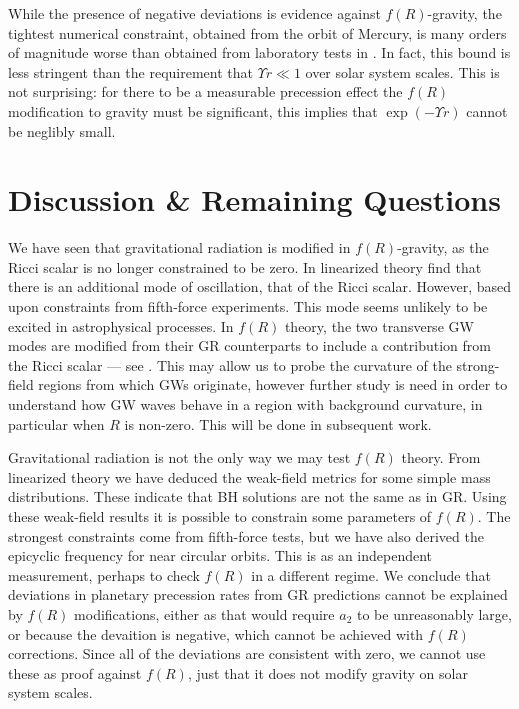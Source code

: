 While the presence of negative deviations is evidence against $f(R)$-gravity, the tightest numerical constraint, obtained from the orbit of Mercury, is many orders of magnitude worse than obtained from laboratory tests in . In fact, this bound is less stringent than the requirement that $\Upsilon r \ll 1$ over solar system scales. This is not surprising: for there to be a measurable precession effect the $f(R)$ modification to gravity must be significant, this implies that $\exp(-\Upsilon r)$ cannot be neglibly small.

\section{Discussion \& Remaining Questions}

We have seen that gravitational radiation is modified in $f(R)$-gravity, as the Ricci scalar is no longer constrained to be zero. In linearized theory find that there is an additional mode of oscillation, that of the Ricci scalar. However, based upon constraints from fifth-force experiments. This mode seems unlikely to be excited in astrophysical processes. In $f(R)$ theory, the two transverse GW modes are modified from their GR counterparts to include a contribution from the Ricci scalar --- see . This may allow us to probe the curvature of the strong-field regions from which GWs originate, however further study is need in order to understand how GW waves behave in a region with background curvature, in particular when $R$ is non-zero. This will be done in subsequent work.

Gravitational radiation is not the only way we may test $f(R)$ theory. From linearized theory we have deduced the weak-field metrics for some simple mass distributions. These indicate that BH solutions are not the same as in GR. Using these weak-field results it is possible to constrain some parameters of $f(R)$. The strongest constraints come from fifth-force tests, but we have also derived the epicyclic frequency for near circular orbits. This is as an independent measurement, perhaps to check $f(R)$ in a different regime. We conclude that deviations in planetary precession rates from GR predictions cannot be explained by $f(R)$ modifications, either as that would require $a_2$ to be unreasonably large, or because the devaition is negative, which cannot be achieved with $f(R)$ corrections. Since all of the deviations are consistent with zero, we cannot use these as proof against $f(R)$, just that it does not modify gravity on solar system scales.

